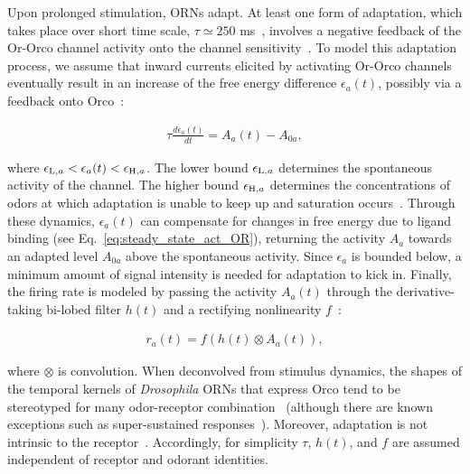 \documentclass[9pt,lineno]{elife}
\begin{document}
Upon prolonged stimulation, ORNs adapt. At least one form of adaptation, which takes place over short time scale, $\tau\simeq 250$ ms~\citep{srinivas_elife}, involves a negative feedback of the Or-Orco channel activity onto the channel sensitivity~\citep{nagel_wilson_biophysical,srinivas_elife}. To model this adaptation process, we assume that inward currents elicited by activating Or-Orco channels eventually result in an increase of the free energy difference $\epsilon_a(t)$, possibly via a feedback onto Orco~\citep{orco_structure}:

\begin{align}
\tau\frac{d\epsilon_a(t)}{dt} = {A}_{a}(t) - A_{0a},
\label{eq:adaptation_dynamics}
\end{align}

where $\epsilon_{\textup{L}, a} < \epsilon_a(t) < \epsilon_{\textup{H}, a}$. The lower bound $\epsilon_{\textup{L}, a}$ determines the spontaneous activity of the channel. The higher bound $\epsilon_{\textup{H}, a}$ determines the concentrations of odors at which adaptation is unable to keep up and saturation occurs~\citep{srinivas_elife}. Through these dynamics, $\epsilon_a(t)$ can compensate for changes in free energy due to ligand binding (see Eq.~\ref{eq:steady_state_act_OR}), returning the activity $A_a$ towards an adapted level $A_{0a}$ above the spontaneous activity. Since $\epsilon_a$ is bounded below, a minimum amount of signal intensity is needed for adaptation to kick in. Finally, the firing rate is modeled by passing the activity $A_a(t)$ through the derivative-taking bi-lobed filter $h(t)$ and a rectifying nonlinearity
$f$~\citep{srinivas_elife}:

\begin{align}
r_a(t)=f\left(h(t) \otimes A_a(t)\right),
\label{eq:firing_machinery}
\end{align}

where $\otimes$ is convolution. When deconvolved from stimulus dynamics, the shapes of the temporal kernels of \textit{Drosophila} ORNs that express Orco tend to be stereotyped for many odor-receptor combination~\citep{martelli,srinivas_elife,si2017invariances} (although there are known exceptions such as super-sustained responses~\citep{montague2011similar}). Moreover, adaptation is not intrinsic to the receptor~\citep{nagel_wilson_biophysical}. Accordingly, for simplicity $\tau$, $h(t)$, and $f$ are assumed independent of receptor and odorant identities.
\end{document}
